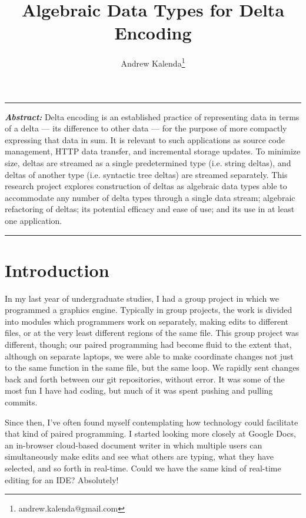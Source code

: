 \documentclass[12pt,a4paper]{article}
\renewenvironment{abstract}{%
	\hfill\begin{minipage}{0.95\textwidth}
		\rule{\textwidth}{1pt}}
	{\par\noindent\rule{\textwidth}{1pt}\end{minipage}}
\begin{document}
	\title{Algebraic Data Types for Delta Encoding}
	\author{Andrew Kalenda\thanks{andrew.kalenda@gmail.com}}
	\maketitle
	\begin{abstract}
	\textbf{\textit{Abstract:}} Delta encoding is an established practice of representing data in terms of a delta --- its difference to other data --- for the purpose of more compactly expressing that data in sum. It is relevant to such applications as source code management, HTTP data transfer, and incremental storage updates. To minimize size, deltas are streamed as a single predetermined type (i.e. string deltas), and deltas of another type (i.e. syntactic tree deltas) are streamed separately. This research project explores construction of deltas as algebraic data types able to accommodate any number of delta types through a single data stream; algebraic refactoring of deltas; its potential efficacy and ease of use; and its use in at least one application.
	\end{abstract}
	
	\section{Introduction}
	
	In my last year of undergraduate studies, I had a group project in which we programmed a graphics engine. Typically in group projects, the work is divided into modules which programmers work on separately, making edits to different files, or at the very least different regions of the same file. This group project was different, though; our paired programming had become fluid to the extent that, although on separate laptops, we were able to make coordinate changes not just to the same function in the same file, but the same loop. We rapidly sent changes back and forth between our git repositories, without error. It was some of the most fun I have had coding, but much of it was spent pushing and pulling commits.
	
	Since then, I've often found myself contemplating how technology could facilitate that kind of paired programming. I started looking more closely at Google Docs, an in-browser cloud-based document writer in which multiple users can simultaneously make edits and see what others are typing, what they have selected, and so forth in real-time. Could we have the same kind of real-time editing for an IDE? Absolutely!
	
\end{document}

